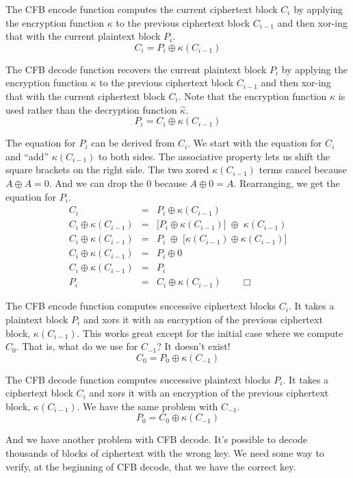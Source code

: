 \documentclass{article}
\begin{document}
The CFB encode function computes the current ciphertext block $C_i$
by applying the encryption function $\kappa$ 
to the previous ciphertext block $C_{i-1}$
and then xor-ing that with the current plaintext block $P_i$.
\[ C_i = P_i \oplus \kappa(C_{i-1}) \]

The CFB decode function recovers the current plaintext block $P_i$
by applying the encryption function $\kappa$ 
to the previous ciphertext block $C_{i-1}$
and then xor-ing that with the current ciphertext block $C_i$.
Note that the encryption function $\kappa$ is used
rather than the decryption function $\hat{\kappa}$.
\[ P_i = C_i \oplus \kappa(C_{i-1}) \]

The equation for $P_i$ can be derived from $C_i$.
We start with the equation for $C_i$ and ``add'' $\kappa(C_{i-1})$ to both sides.
The associative property lets us shift the square brackets on the right side.
The two xored $\kappa(C_{i-1})$ terms cancel because $A \oplus A = 0$.
And we can drop the 0 because $A \oplus 0 = A$.
Rearranging, we get the equation for $P_i$.
\begin{eqnarray*}
  C_i  &=&  P_i \oplus \kappa(C_{i-1}) \\
  C_i \oplus \kappa(C_{i-1})  &=&
      \big[ P_i \oplus \kappa(C_{i-1}) \big] \; \oplus \; \kappa(C_{i-1}) \\
  C_i \oplus \kappa(C_{i-1})  &=&
      P_i \; \oplus \; \big[ \kappa(C_{i-1}) \oplus \kappa(C_{i-1}) \big] \\
  C_i \oplus \kappa(C_{i-1})  &=&  P_i \oplus 0 \\
  C_i \oplus \kappa(C_{i-1})  &=&  P_i \\
  P_i  &=&  C_i \oplus \kappa(C_{i-1}) \qquad \Box
\end{eqnarray*}

The CFB encode function computes successive ciphertext blocks $C_i$.
It takes a plaintext block $P_i$ and xors it with 
an encryption of the previous ciphertext block, $\kappa(C_{i-1})$.
This works great except for the initial case where we compute $C_0$.
That is, what do we use for $C_{-1}$?  It doesn't exist!
\[ C_0 = P_0 \oplus \kappa(C_{-1}) \]

The CFB decode function computes successive plaintext blocks $P_i$.
It takes a ciphertext block $C_i$ and xors it with 
an encryption of the previous ciphertext block, $\kappa(C_{i-1})$.
We have the same problem with $C_{-1}$.
\[ P_0 = C_0 \oplus \kappa(C_{-1}) \]

And we have another problem with CFB decode.
It's possible to decode thousands of blocks of ciphertext with the wrong key.
We need some way to verify, at the beginning of CFB decode,
that we have the correct key.
\end{document}
